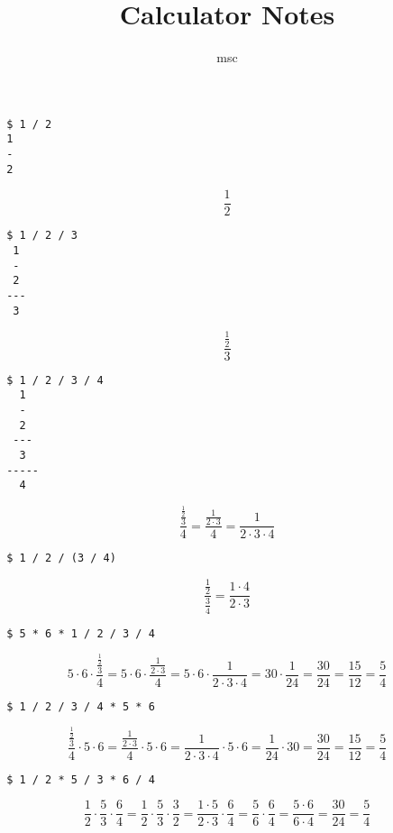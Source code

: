 \documentclass[a4paper,10pt]{article}
\title{Calculator Notes}
\author{msc}
\begin{document}




\begin{verbatim}
 $ 1 / 2
 1
 -
 2
\end{verbatim}

$$\frac{1}{2}$$


\begin{verbatim}
 $ 1 / 2 / 3
  1
  -
  2
 ---
  3
\end{verbatim}

\[\frac{\frac{1}{2}}{3}\]


\begin{verbatim}
 $ 1 / 2 / 3 / 4
   1
   -
   2
  ---
   3
 -----
   4
\end{verbatim}
\[
\frac{\frac{\frac{1}{2}}{3}}{4}=\frac{\frac{1}{2\cdot3}}{4} = \frac{1}{2\cdot3\cdot4}
\]


\begin{verbatim}
 $ 1 / 2 / (3 / 4)
\end{verbatim}
\[
\frac{\frac{1}{2}}{\frac{3}{4}}=\frac{1\cdot4}{2\cdot3}
\]


\begin{verbatim}
 $ 5 * 6 * 1 / 2 / 3 / 4
\end{verbatim}
\[
5\cdot6\cdot\frac{\frac{\frac{1}{2}}{3}}{4} =
5\cdot6\cdot\frac{\frac{1}{2\cdot3}}{4} =
5\cdot6\cdot\frac{1}{2\cdot3\cdot4} =
30\cdot\frac{1}{24} =
\frac{30}{24} =
\frac{15}{12} =
\frac{5}{4}
\]


\begin{verbatim}
 $ 1 / 2 / 3 / 4 * 5 * 6
\end{verbatim}
\[
\frac{\frac{\frac{1}{2}}{3}}{4}\cdot5\cdot6 =
\frac{\frac{1}{2\cdot3}}{4}\cdot5\cdot6 =
\frac{1}{2\cdot3\cdot4}\cdot5\cdot6 =
\frac{1}{24}\cdot30 =
\frac{30}{24} =
\frac{15}{12} =
\frac{5}{4}
\]


\begin{verbatim}
 $ 1 / 2 * 5 / 3 * 6 / 4
\end{verbatim}
\[
\frac{1}{2}\cdot\frac{5}{3}\cdot\frac{6}{4} =
\frac{1}{2}\cdot\frac{5}{3}\cdot\frac{3}{2} =
\frac{1\cdot5}{2\cdot3}\cdot\frac{6}{4} =
\frac{5}{6}\cdot\frac{6}{4} =
\frac{5\cdot6}{6\cdot4} =
\frac{30}{24} =
\frac{5}{4}
\]
\end{document}
